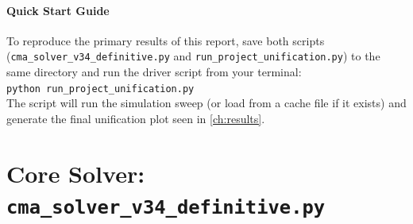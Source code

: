 \documentclass[11pt, a4paper]{report}
\begin{document}
\paragraph{Quick Start Guide}
To reproduce the primary results of this report, save both scripts (\texttt{cma\_solver\_v34\_definitive.py} and \texttt{run\_project\_unification.py}) to the same directory and run the driver script from your terminal: \\
\texttt{python run\_project\_unification.py} \\
The script will run the simulation sweep (or load from a cache file if it exists) and generate the final unification plot seen in \cref{ch:results}.

\section{Core Solver: \texttt{cma\_solver\_v34\_definitive.py}}
\end{document}
